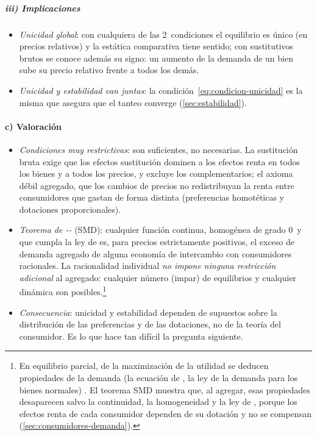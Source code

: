 \documentclass[11pt]{article}
\begin{document}
\subparagraph{iii) Implicaciones}

\begin{itemize}
\item \emph{Unicidad global}: con cualquiera de las 2~condiciones el equilibrio es único (en precios relativos) y la estática comparativa tiene sentido; con sustitutivos brutos se conoce además su signo: un aumento de la demanda de un bien sube su precio relativo frente a todos los demás\nocite{MasColellWhinstonGreen1995}.
\item \emph{Unicidad y estabilidad van juntas}: la condición~\eqref{eq:condicion-unicidad} es la misma que asegura que el tanteo converge (\ref{sec:estabilidad}).
\end{itemize}

\paragraph{c) Valoración}

\begin{itemize}
\item \emph{Condiciones muy restrictivas}: son suficientes, no necesarias. La sustitución bruta exige que los efectos sustitución dominen a los efectos renta en todos los bienes y a todos los precios, y excluye los complementarios; el axioma débil agregado, que los cambios de precios no redistribuyan la renta entre consumidores que gastan de forma distinta (preferencias homotéticas y dotaciones proporcionales)\nocite{MasColellWhinstonGreen1995}.
\item \emph{Teorema de --} (SMD): cualquier función continua, homogénea de grado 0~y que cumpla la ley de  es, para precios estrictamente positivos, el exceso de demanda agregado de alguna economía de intercambio con consumidores racionales\nocite{Sonnenschein1972Market,Sonnenschein1973Walras,Mantel1974Characterization,Debreu1974Excess}. La racionalidad individual \emph{no impone ninguna restricción adicional} al agregado: cualquier número (impar) de equilibrios y cualquier dinámica son posibles.\footnote{En equilibrio parcial, de la maximización de la utilidad se deducen propiedades de la demanda (la ecuación de , la ley de la demanda para los bienes normales) . El teorema SMD muestra que, al agregar, esas propiedades desaparecen salvo la continuidad, la homogeneidad y la ley de , porque los efectos renta de cada consumidor dependen de su dotación y no se compensan (\ref{sec:consumidores-demanda}).}
\item \emph{Consecuencia}: unicidad y estabilidad dependen de supuestos sobre la distribución de las preferencias y de las dotaciones, no de la teoría del consumidor\nocite{MasColellWhinstonGreen1995}. Es lo que hace tan difícil la pregunta siguiente.
\end{itemize}
\end{document}
